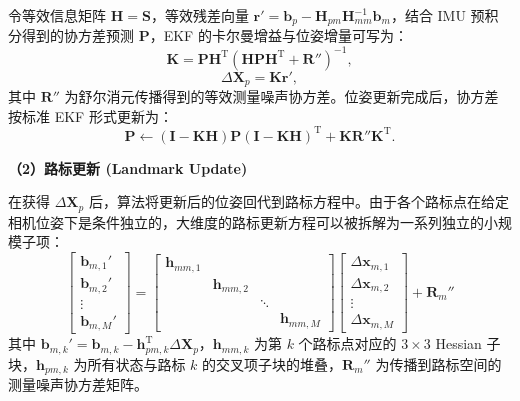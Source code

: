 令等效信息矩阵 $\mathbf{H}=\mathbf{S}$，等效残差向量 $\mathbf{r}'=\mathbf{b}_p-\mathbf{H}_{pm}\mathbf{H}_{mm}^{-1}\mathbf{b}_m$，结合 IMU 预积分得到的协方差预测 $\mathbf{P}$\cite{forster2017onmanifold}，EKF 的卡尔曼增益与位姿增量可写为：
\begin{equation}
\mathbf{K} = \mathbf{P}\mathbf{H}^{\mathrm{T}}\left(\mathbf{H}\mathbf{P}\mathbf{H}^{\mathrm{T}} + \mathbf{R}''\right)^{-1},
\end{equation}
\begin{equation}
\Delta\mathbf{X}_p = \mathbf{K}\mathbf{r}',
\label{eq:ekf_pose_update}
\end{equation}
其中 $\mathbf{R}''$ 为舒尔消元传播得到的等效测量噪声协方差。位姿更新完成后，协方差按标准 EKF 形式更新为：
\begin{equation}
\mathbf{P} \leftarrow (\mathbf{I}-\mathbf{K}\mathbf{H})\mathbf{P}(\mathbf{I}-\mathbf{K}\mathbf{H})^{\mathrm{T}} + \mathbf{K}\mathbf{R}''\mathbf{K}^{\mathrm{T}}.
\end{equation}

\textbf{（2）路标更新 (Landmark Update)}

在获得 $\Delta\mathbf{X}_p$ 后，算法将更新后的位姿回代到路标方程中。由于各个路标点在给定相机位姿下是条件独立的，大维度的路标更新方程可以被拆解为一系列独立的小规模子项：
\begin{equation}
\begin{bmatrix}
\mathbf{b}_{m,1}' \\
\mathbf{b}_{m,2}' \\
\vdots \\
\mathbf{b}_{m,M}'
\end{bmatrix}
=
\begin{bmatrix}
\mathbf{h}_{mm,1} & & & \\
& \mathbf{h}_{mm,2} & & \\
& & \ddots & \\
& & & \mathbf{h}_{mm,M}
\end{bmatrix}
\begin{bmatrix}
\Delta \mathbf{x}_{m,1} \\
\Delta \mathbf{x}_{m,2} \\
\vdots \\
\Delta \mathbf{x}_{m,M}
\end{bmatrix}
+ \mathbf{R}_m''
\end{equation}
其中 $\mathbf{b}_{m,k}' = \mathbf{b}_{m,k} - \mathbf{h}_{pm,k}^{\mathrm{T}} \Delta \mathbf{X}_p$，$\mathbf{h}_{mm,k}$ 为第 $k$ 个路标点对应的 $3 \times 3$ Hessian 子块，$\mathbf{h}_{pm,k}$ 为所有状态与路标 $k$ 的交叉项子块的堆叠，$\mathbf{R}_m''$ 为传播到路标空间的测量噪声协方差矩阵。

